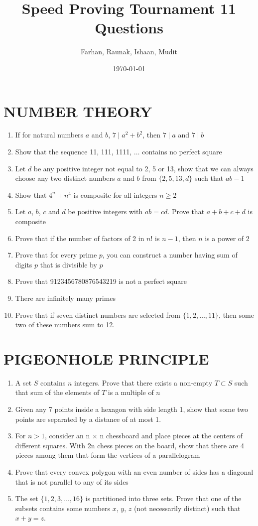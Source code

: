 \documentclass[12pt]{article}
\title{Speed Proving Tournament 11 Questions}
\author{Farhan, Raunak, Ishaan, Mudit}
\date{\today}
\begin{document}
\doublespacing
\maketitle
\section{NUMBER THEORY}

\begin{enumerate}
    \item If for natural numbers $a$ and $b$, $7 \mid a^{2}+b^{2}$, then $7 \mid a$ and $7 \mid b$
    \item Show that the sequence 11, 111, 1111, $\dots$ contains no perfect square
    \item Let $d$ be any positive integer not equal to 2, 5 or 13, show that we can always choose any two distinct numbers $a$ and $b$ from $\{2,5,13,d\}$ such that $ab-1$
    \item Show that $4^{n}+n^{4}$ is composite for all integers $n\ge 2$
    \item Let $a$, $b$, $c$ and $d$ be positive integers with $ab=cd$. Prove that $a+b+c+d$ is composite        
    \item Prove that if the number of factors of 2 in $n!$ is $n-1$, then $n$ is a power of 2
    \item Prove that for every prime $p$, you can construct a number having sum of digits $p$ that is divisible by $p$
    \item Prove that 9123456780876543219 is not a perfect square
    \item There are infinitely many primes
    \item Prove that if seven distinct numbers are selected from $\{1, 2,\dots, 11\}$, then some two of these numbers sum to 12.
\end{enumerate}

\section{PIGEONHOLE PRINCIPLE}
\begin{enumerate}
    \item A set $S$ contains $n$ integers. Prove that there exists a non-empty $T \subset S$ such that sum of the elements of $T$ is a multiple of $n$
    \item Given any 7 points inside a hexagon with side length 1, show that some two points are separated by a distance of at most 1.
    \item For $n>1$, consider an n × n chessboard and place pieces at the centers of different squares. With 2n chess pieces on the board, show that there are 4 pieces among them that form the vertices of a parallelogram
    \item Prove that every convex polygon with an even number of sides has a diagonal that is not parallel to any of its sides
    \item The set $\{1,2,3,\dots,16\}$ is partitioned into three sets. Prove that one of the subsets contains some numbers $x$, $y$, $z$ (not necessarily distinct) such that $x+y=z$.
\end{enumerate}
\end{document}
